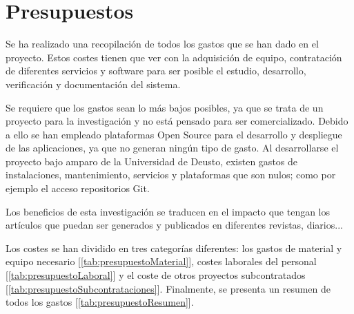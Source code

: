 \chapter{Presupuestos}
Se ha realizado una recopilación de todos los gastos que se han dado en el proyecto. Estos costes tienen que ver con la adquisición de equipo, contratación de diferentes servicios y software para ser posible el estudio, desarrollo, verificación y documentación del sistema.

Se requiere que los gastos sean lo más bajos posibles, ya que se trata de un proyecto para la investigación y no está pensado para ser comercializado. Debido a ello se han empleado plataformas Open Source para el desarrollo y despliegue de las aplicaciones, ya que no generan ningún tipo de gasto. Al desarrollarse el proyecto bajo amparo de la Universidad de Deusto, existen gastos de instalaciones, mantenimiento, servicios y plataformas que son nulos; como por ejemplo el acceso repositorios Git.

Los beneficios de esta investigación se traducen en el impacto que tengan los artículos que puedan ser generados y publicados en diferentes revistas, diarios...

Los costes se han dividido en tres categorías diferentes: los gastos de material y equipo necesario [\ref{tab:presupuestoMaterial}], costes laborales del personal [\ref{tab:presupuestoLaboral}] y el coste de otros proyectos subcontratados [\ref{tab:presupuestoSubcontrataciones}]. Finalmente, se presenta un resumen de todos los gastos [\ref{tab:presupuestoResumen}].

